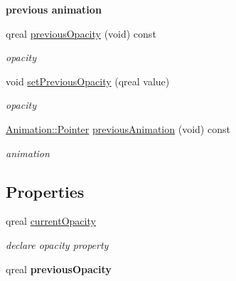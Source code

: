 \begin{Indent}\textbf{ previous animation}\par
\begin{DoxyCompactItemize}
\item 
\mbox{\label{class_mdi_window_data_ac546e23b9f33803e321e6fc50963a322}} 
qreal \hyperlink{class_mdi_window_data_ac546e23b9f33803e321e6fc50963a322}{previous\+Opacity} (void) const
\begin{DoxyCompactList}\small\item\em opacity \end{DoxyCompactList}\item 
\mbox{\label{class_mdi_window_data_ae9545d21b54f1516295b560c127aa21c}} 
void \hyperlink{class_mdi_window_data_ae9545d21b54f1516295b560c127aa21c}{set\+Previous\+Opacity} (qreal value)
\begin{DoxyCompactList}\small\item\em opacity \end{DoxyCompactList}\item 
\mbox{\label{class_mdi_window_data_a64be5924b885eb157250f0fdb47303dd}} 
\hyperlink{class_animation_ac48a8d074abd43dc3f6485353ba24e30}{Animation\+::\+Pointer} \hyperlink{class_mdi_window_data_a64be5924b885eb157250f0fdb47303dd}{previous\+Animation} (void) const
\begin{DoxyCompactList}\small\item\em animation \end{DoxyCompactList}\end{DoxyCompactItemize}
\end{Indent}
\subsection*{Properties}
\begin{DoxyCompactItemize}
\item 
\mbox{\label{class_mdi_window_data_a01064df3d653df0b101a74b3a65b2d98}} 
qreal \hyperlink{class_mdi_window_data_a01064df3d653df0b101a74b3a65b2d98}{current\+Opacity}
\begin{DoxyCompactList}\small\item\em declare opacity property \end{DoxyCompactList}\item 
\mbox{\label{class_mdi_window_data_a54ea04039071c963866740bebe273363}} 
qreal {\bfseries previous\+Opacity}
\end{DoxyCompactItemize}
